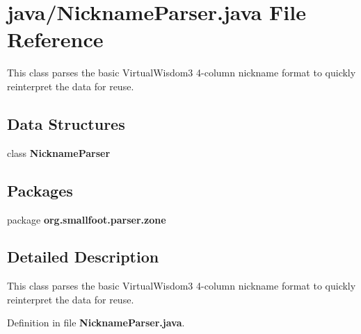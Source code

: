 \section{java/\+Nickname\+Parser.java File Reference}
\label{NicknameParser_8java}


This class parses the basic Virtual\+Wisdom3 4-\/column nickname format to quickly reinterpret the data for reuse.  


\subsection*{Data Structures}
\begin{DoxyCompactItemize}
\item 
class {\bf Nickname\+Parser}
\end{DoxyCompactItemize}
\subsection*{Packages}
\begin{DoxyCompactItemize}
\item 
package {\bf org.\+smallfoot.\+parser.\+zone}
\end{DoxyCompactItemize}


\subsection{Detailed Description}
This class parses the basic Virtual\+Wisdom3 4-\/column nickname format to quickly reinterpret the data for reuse. 



Definition in file {\bf Nickname\+Parser.\+java}.

